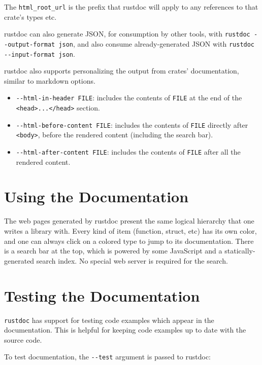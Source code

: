 \documentclass[]{article}
\begin{document}
The \texttt{html\_root\_url} is the prefix that rustdoc will apply to
any references to that crate's types etc.

rustdoc can also generate JSON, for consumption by other tools, with
\texttt{rustdoc -\/-output-format json}, and also consume
already-generated JSON with \texttt{rustdoc -\/-input-format json}.

rustdoc also supports personalizing the output from crates'
documentation, similar to markdown options.

\begin{itemize}
\itemsep1pt\parskip0pt
\item
  \texttt{-\/-html-in-header FILE}: includes the contents of
  \texttt{FILE} at the end of the
  \texttt{\textless{}head\textgreater{}...\textless{}/head\textgreater{}}
  section.
\item
  \texttt{-\/-html-before-content FILE}: includes the contents of
  \texttt{FILE} directly after \texttt{\textless{}body\textgreater{}},
  before the rendered content (including the search bar).
\item
  \texttt{-\/-html-after-content FILE}: includes the contents of
  \texttt{FILE} after all the rendered content.
\end{itemize}

\section{Using the Documentation}\label{using-the-documentation}

The web pages generated by rustdoc present the same logical hierarchy
that one writes a library with. Every kind of item (function, struct,
etc) has its own color, and one can always click on a colored type to
jump to its documentation. There is a search bar at the top, which is
powered by some JavaScript and a statically-generated search index. No
special web server is required for the search.

\section{Testing the Documentation}\label{testing-the-documentation}

\texttt{rustdoc} has support for testing code examples which appear in
the documentation. This is helpful for keeping code examples up to date
with the source code.

To test documentation, the \texttt{-\/-test} argument is passed to
rustdoc:
\end{document}
